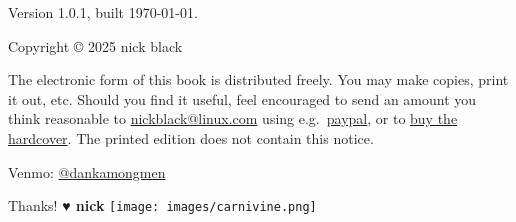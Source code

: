 \clearpage
Version 1.0.1, built \today.

Copyright © 2025 nick black

\bigskip
The electronic form of this book is distributed freely.
You may make copies, print it out, etc.
Should you find it useful, feel encouraged to send an amount you think reasonable to
  \href{mailto:nickblack@linux.com}{nickblack@linux.com} using
  e.g.\ \href{https://paypal.me/dankamongmen}{paypal},
  or to \href{https://goldandappelpub.com/pgo-quantitative.html}{buy the hardcover}.
The printed edition does not contain this notice.

\bigskip
Venmo: \href{https://venmo.com/?txn=pay&audience=friends&recipients=dankamongmen&amount=10&note=pgoquant}{@dankamongmen}

\bigskip
Thanks! {\textbf{♥ nick}}
\vfill\texttt{[image: images/carnivine.png]}\vfill
